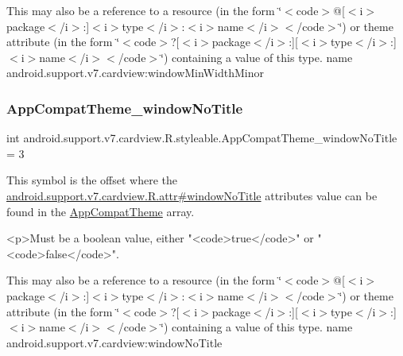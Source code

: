 This may also be a reference to a resource (in the form \char`\"{}$<$code$>$@\mbox{[}$<$i$>$package$<$/i$>$\+:\mbox{]}$<$i$>$type$<$/i$>$\+:$<$i$>$name$<$/i$>$$<$/code$>$\char`\"{}) or theme attribute (in the form \char`\"{}$<$code$>$?\mbox{[}$<$i$>$package$<$/i$>$\+:\mbox{]}\mbox{[}$<$i$>$type$<$/i$>$\+:\mbox{]}$<$i$>$name$<$/i$>$$<$/code$>$\char`\"{}) containing a value of this type.  name android.\+support.\+v7.\+cardview\+:window\+Min\+Width\+Minor \mbox{\label{classandroid_1_1support_1_1v7_1_1cardview_1_1R_1_1styleable_af1f90e0bb899d8d3fc975f88951bf9c2}} 
\subsubsection{\texorpdfstring{App\+Compat\+Theme\+\_\+window\+No\+Title}{AppCompatTheme\_windowNoTitle}}
{\footnotesize\ttfamily int android.\+support.\+v7.\+cardview.\+R.\+styleable.\+App\+Compat\+Theme\+\_\+window\+No\+Title = 3\hspace{0.3cm}{\ttfamily [static]}}

This symbol is the offset where the \hyperlink{classandroid_1_1support_1_1v7_1_1cardview_1_1R_1_1attr_a874ce217d920846ce7cdff9d2841822b}{android.\+support.\+v7.\+cardview.\+R.\+attr\#window\+No\+Title} attribute\textquotesingle{}s value can be found in the \hyperlink{classandroid_1_1support_1_1v7_1_1cardview_1_1R_1_1styleable_a52e6f69f954ecc2622d72c0b4d298938}{App\+Compat\+Theme} array.

\begin{DoxyVerb}      <p>Must be a boolean value, either "<code>true</code>" or "<code>false</code>".
\end{DoxyVerb}
 

This may also be a reference to a resource (in the form \char`\"{}$<$code$>$@\mbox{[}$<$i$>$package$<$/i$>$\+:\mbox{]}$<$i$>$type$<$/i$>$\+:$<$i$>$name$<$/i$>$$<$/code$>$\char`\"{}) or theme attribute (in the form \char`\"{}$<$code$>$?\mbox{[}$<$i$>$package$<$/i$>$\+:\mbox{]}\mbox{[}$<$i$>$type$<$/i$>$\+:\mbox{]}$<$i$>$name$<$/i$>$$<$/code$>$\char`\"{}) containing a value of this type.  name android.\+support.\+v7.\+cardview\+:window\+No\+Title \mbox{\label{classandroid_1_1support_1_1v7_1_1cardview_1_1R_1_1styleable_a2c7e34ab9878226fa3cb5d06e0b274a8}} 
